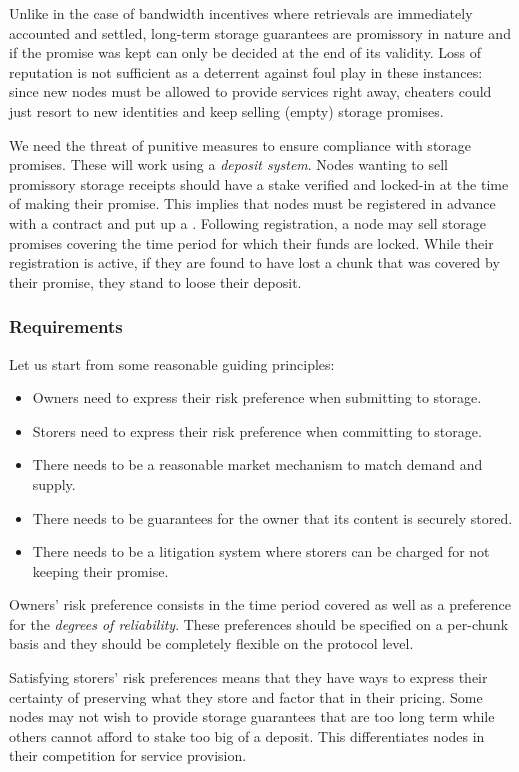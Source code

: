 Unlike in the case of bandwidth incentives where retrievals are immediately accounted and settled, long-term storage guarantees are promissory in nature and if the promise was kept can only be decided at the end of its validity. Loss of reputation is not sufficient as a deterrent against foul play in these instances: since new nodes must be allowed to provide services right away, cheaters could just resort to new identities and keep selling (empty) storage promises.

We need the threat of punitive measures to ensure compliance with storage promises. These will work using a \emph{deposit system}. Nodes wanting to sell promissory storage receipts should have a stake verified and locked-in at the time of making their promise. This implies that nodes must be registered in advance with a contract and put up a . Following registration, a node may sell storage promises covering the time period for which their funds are locked. While their registration is active, if they are found to have lost a chunk that was covered by their promise, they stand to loose their deposit.

\subsubsection{Requirements}

Let us start from some reasonable guiding principles:

\begin{itemize}
\item Owners need to express their risk preference when submitting to storage.
\item Storers need to express their risk preference when committing to storage.
\item There needs to be a reasonable market mechanism to match demand and supply.
\item There needs to be guarantees for the owner that its content is securely stored.
\item There needs to be a litigation system where storers can be charged for not keeping their promise.
\end{itemize}

Owners' risk preference consists in the time period covered as well as a preference for the \emph{degrees of reliability}. These preferences should be specified on a per-chunk basis and they should be completely flexible on the protocol level.

Satisfying storers' risk preferences means that they have ways to express their certainty of preserving what they store and factor that in their pricing. Some nodes may not wish to provide storage guarantees that are too long term while others cannot afford to stake too big of a deposit. This differentiates nodes in their competition for service provision.

